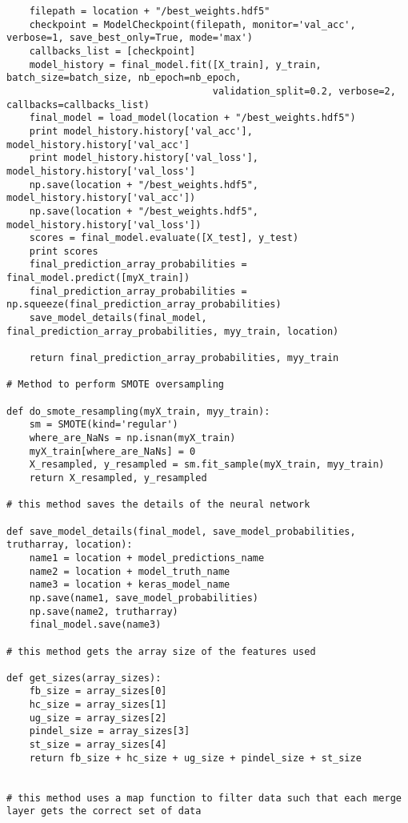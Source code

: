 \documentclass{article}
\begin{document}
\begin{verbatim}
    filepath = location + "/best_weights.hdf5"
    checkpoint = ModelCheckpoint(filepath, monitor='val_acc', verbose=1, save_best_only=True, mode='max')
    callbacks_list = [checkpoint]
    model_history = final_model.fit([X_train], y_train, batch_size=batch_size, nb_epoch=nb_epoch,
                                    validation_split=0.2, verbose=2, callbacks=callbacks_list)
    final_model = load_model(location + "/best_weights.hdf5")
    print model_history.history['val_acc'], model_history.history['val_acc']
    print model_history.history['val_loss'], model_history.history['val_loss']
    np.save(location + "/best_weights.hdf5", model_history.history['val_acc'])
    np.save(location + "/best_weights.hdf5", model_history.history['val_loss'])
    scores = final_model.evaluate([X_test], y_test)
    print scores
    final_prediction_array_probabilities = final_model.predict([myX_train])
    final_prediction_array_probabilities = np.squeeze(final_prediction_array_probabilities)
    save_model_details(final_model, final_prediction_array_probabilities, myy_train, location)

    return final_prediction_array_probabilities, myy_train

# Method to perform SMOTE oversampling

def do_smote_resampling(myX_train, myy_train):
    sm = SMOTE(kind='regular')
    where_are_NaNs = np.isnan(myX_train)
    myX_train[where_are_NaNs] = 0
    X_resampled, y_resampled = sm.fit_sample(myX_train, myy_train)
    return X_resampled, y_resampled

# this method saves the details of the neural network

def save_model_details(final_model, save_model_probabilities, trutharray, location):
    name1 = location + model_predictions_name
    name2 = location + model_truth_name
    name3 = location + keras_model_name
    np.save(name1, save_model_probabilities)
    np.save(name2, trutharray)
    final_model.save(name3)

# this method gets the array size of the features used

def get_sizes(array_sizes):
    fb_size = array_sizes[0]
    hc_size = array_sizes[1]
    ug_size = array_sizes[2]
    pindel_size = array_sizes[3]
    st_size = array_sizes[4]
    return fb_size + hc_size + ug_size + pindel_size + st_size

	
# this method uses a map function to filter data such that each merge layer gets the correct set of data


\end{verbatim}
\end{document}
